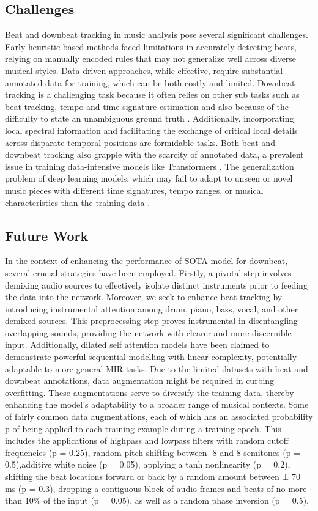 \documentclass[conference]{IEEEtran}
\begin{document}
\subsection{Challenges}
Beat and downbeat tracking in music analysis pose several significant challenges. Early heuristic-based methods faced limitations in accurately detecting beats, relying on manually encoded rules that may not generalize well across diverse musical styles. Data-driven approaches, while effective, require substantial annotated data for training, which can be both costly and limited. Downbeat tracking is a challenging task because it often relies on other sub tasks such as beat tracking, tempo and time signature estimation and also because of the difficulty to state an unambiguous ground truth \cite{b8}\cite{b18}. Additionally, incorporating local spectral information and facilitating the exchange of critical local details across disparate temporal positions are formidable tasks. Both beat and downbeat tracking also grapple with the scarcity of annotated data, a prevalent issue in training data-intensive models like Transformers \cite{b8}\cite{b14}. The generalization problem of deep learning models, which may fail to adapt to unseen or novel music pieces with different time signatures, tempo ranges, or musical characteristics than the training data \cite{b8}.

\subsection{Future Work}
In the context of enhancing the performance of SOTA model for downbeat, several crucial strategies have been employed. Firstly, a pivotal step involves demixing audio sources to effectively isolate distinct instruments prior to feeding the data into the network\cite{b8}. Moreover, we seek to enhance
beat tracking by introducing instrumental attention among drum, piano, bass, vocal, and other demixed sources. This preprocessing step proves instrumental in disentangling overlapping sounds, providing the network with clearer and more discernible input. Additionally, dilated self attention models have been claimed to demonstrate powerful sequential modelling with linear complexity, potentially adaptable to more general MIR tasks\cite{b8}. Due to the limited datasets with beat and downbeat annotations, data augmentation might be required in curbing overfitting. These augmentations serve to diversify the training data, thereby enhancing the model's adaptability to a broader range of musical contexts. Some of fairly common data augmentations, each of which has an associated probability p of being applied to each training example during a training epoch. This includes the applications of highpass and lowpass filters with random cutoff frequencies (p = 0.25), random pitch shifting between -8 and 8 semitones (p = 0.5),additive white noise (p = 0.05), applying a tanh nonlinearity (p = 0.2), shifting the beat locations  forward or back by a random amount between ± 70 ms (p = 0.3), dropping a contiguous block of audio frames and beats of no more than 10\% of the input (p = 0.05), as well as a random phase inversion (p = 0.5)\cite{b13}.
\end{document}
